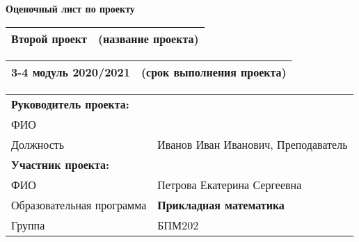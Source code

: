 \documentclass[10pt]{article}
\begin{document}
\sloppy	

\thispagestyle{empty}

\begin{center}
	{\Large \bf Оценочный лист по проекту}
\end{center}



\begin{table*}[h!]
	\centering
	\begin{tabular}{p{}<{\centering}b{}<{\raggedleft}}
		\noalign{\smallskip}
	 	Второй проект & (название проекта)\\
	\hline
	\end{tabular}
\end{table*}
\vspace{-0.5cm}
\begin{table*}[h!]
	\centering
	\begin{tabular}{p{}<{\centering}b{}<{\raggedleft}}
		\noalign{\smallskip}
		3-4 модуль 2020/2021& (срок выполнения проекта)\\
		\hline
	\end{tabular}
\end{table*}
\vspace{-0.5cm}

\begin{table*}[h!]
	\centering
	\begin{tabular}{|p{}<{\raggedright}|b{}|}
		\noalign{\smallskip}
		\hline
		{\bf Руководитель проекта:} & \\ 
		ФИО & \\
		Должность  & Иванов Иван Иванович, Преподаватель \multirow{3}{*}{}\\
		\hline
		
		{\bf Участник проекта\footnotemark : } & \\ 
		
		\hline
		ФИО & Петрова Екатерина Сергеевна \\
		\hline
		Образовательная программа  & {\bf Прикладная математика}\\
		\hline
		Группа & БПМ202\\
		\hline	
	\end{tabular}
\end{table*}
\end{document}
